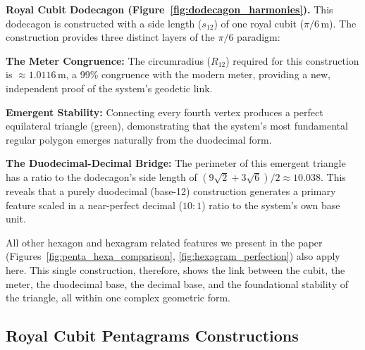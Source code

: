 \documentclass[11pt]{article}
\begin{document}
\textbf{Royal Cubit Dodecagon (Figure~\ref{fig:dodecagon_harmonies}).} This dodecagon is constructed with a side length ($s_{12}$) of one royal cubit ($\pi/6\,\text{m}$). The construction provides three distinct layers of the $\pi/6$ paradigm:
    \par\medskip %
    \textbf{The Meter Congruence:} The circumradius ($R_{12}$) required for this construction is $\approx 1.0116$\,m, a 99\% congruence with the modern meter, providing a new, independent proof of the system's geodetic link.
    \par\medskip
    \textbf{Emergent Stability:} Connecting every fourth vertex produces a perfect equilateral triangle (green), demonstrating that the system's most fundamental regular polygon emerges naturally from the duodecimal form.
    \par\medskip
    \textbf{The Duodecimal-Decimal Bridge:} The perimeter of this emergent triangle has a ratio to the dodecagon's side length of $(9\sqrt{2} + 3\sqrt{6}) / 2 \approx 10.038$. This reveals that a purely duodecimal (base-12) construction generates a primary feature scaled in a near-perfect decimal ($10:1$) ratio to the system's own base unit.
    \par\medskip
    All other hexagon and hexagram related features we present in the paper (Figures~\ref{fig:penta_hexa_comparison}, \ref{fig:hexagram_perfection}) also apply here. This single construction, therefore, shows the link between the cubit, the meter, the duodecimal base, the decimal base, and the foundational stability of the triangle, all within one complex geometric form.

\subsection{Royal Cubit Pentagrams Constructions}
\end{document}
